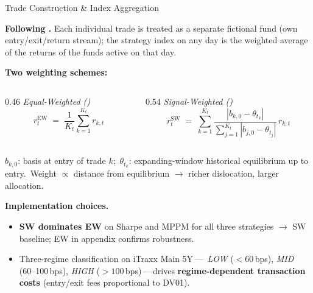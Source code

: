 \documentclass[aspectratio=169,11pt]{beamer}
\newcommand{\hlt}[1]{\textcolor{edhecred}{\textbf{#1}}}     %
\newcommand{\hltb}[1]{\textcolor{accentblue}{\textbf{#1}}}  %
\begin{document}
\begin{frame}[t]{Trade Construction \& Index Aggregation}
\small

\textbf{Following \citet{duarte2007risk}.} Each individual trade is treated as
a separate fictional fund (own entry/exit/return stream); the strategy
index on any day is the weighted average of the returns of the funds active
on that day.

\vspace{0.20cm}

\textbf{Two weighting schemes:}
\begin{columns}[T]
  \begin{column}{0.46\textwidth}
    \emph{Equal-Weighted (\citealp{duarte2007risk})}
    \[
      r_t^{\text{EW}} \;=\; \frac{1}{K_t}\sum_{k=1}^{K_t} r_{k,t}
    \]
  \end{column}
  \begin{column}{0.54\textwidth}
    \emph{Signal-Weighted (\citealp{rebonato2021convexity})}
    \[
      r_t^{\text{SW}} \;=\; \sum_{k=1}^{K_t}
        \frac{|b_{k,0} - \theta_{t_k}|}
             {\sum_{j=1}^{K_t}|b_{j,0} - \theta_{t_j}|} \, r_{k,t}
    \]
  \end{column}
\end{columns}

\vspace{0.05cm}
{\footnotesize $b_{k,0}$: basis at entry of trade $k$;\
$\theta_{t_k}$: expanding-window historical equilibrium up to entry.\
Weight $\propto$ distance from equilibrium $\to$ richer dislocation, larger allocation.}

\vspace{0.20cm}

\textbf{Implementation choices.}
\begin{itemize}\itemsep=0.06cm
  \item \hlt{SW dominates EW} on Sharpe and MPPM for all three strategies
        $\to$ SW baseline; EW in appendix confirms robustness.
  \item Three-regime classification on iTraxx Main 5Y\,---\,
        \emph{LOW} ($<60$\,bps), \emph{MID} (60--100\,bps),
        \emph{HIGH} ($>100$\,bps)\,---\,drives \hltb{regime-dependent
        transaction costs} (entry/exit fees proportional to DV01).
\end{itemize}

\end{frame}
\end{document}

